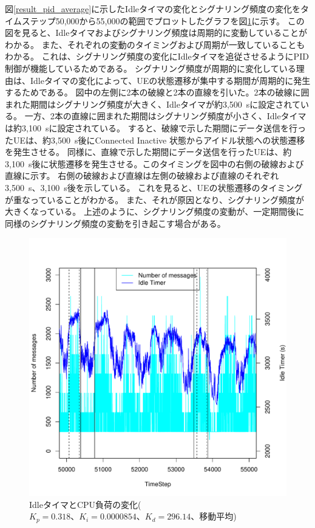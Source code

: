 \documentclass[a4j]{ujarticle}
\begin{document}
図\ref{result_pid_average}に示したIdleタイマの変化とシグナリング頻度の変化をタイムステップ50,000から55,000の範囲でプロットしたグラフを図\ref{scenario_5_analyze_86400_345600_0-318_3725_931-25_0-125_average}に示す。
この図を見ると、Idleタイマおよびシグナリング頻度は周期的に変動していることがわかる。
また、それぞれの変動のタイミングおよび周期が一致していることもわかる。
これは、シグナリング頻度の変化にIdleタイマを追従させるようにPID制御が機能しているためである。
シグナリング頻度が周期的に変化している理由は、Idleタイマの変化によって、UEの状態遷移が集中する期間が周期的に発生するためである。
図中の左側に2本の破線と2本の直線を引いた。2本の破線に囲まれた期間はシグナリング頻度が大きく、Idleタイマが約3,500~sに設定されている。
一方、2本の直線に囲まれた期間はシグナリング頻度が小さく、Idleタイマは約3,100~sに設定されている。
すると、破線で示した期間にデータ送信を行ったUEは、約3,500~s後にConnected Inactive 状態からアイドル状態への状態遷移を発生させる。
同様に、直線で示した期間にデータ送信を行ったUEは、約3,100~s後に状態遷移を発生させる。このタイミングを図中の右側の破線および直線に示す。
右側の破線および直線は左側の破線および直線のそれぞれ3,500~s、3,100~s後を示している。
これを見ると、UEの状態遷移のタイミングが重なっていることがわかる。
また、それが原因となり、シグナリング頻度が大きくなっている。
上述のように、シグナリング頻度の変動が、一定期間後に同様のシグナリング頻度の変動を引き起こす場合がある。
\begin{figure}[htbp]
  \centering
    \includegraphics[width=1\hsize]{scenario_5_analyze_86400_345600_0-318_3725_931-25_0-125_average.pdf}
    \caption{IdleタイマとCPU負荷の変化($K_p = 0.318、K_i = 0.0000854、K_d = 296.14$、移動平均)}
    \label{scenario_5_analyze_86400_345600_0-318_3725_931-25_0-125_average}
\end{figure}
\end{document}
